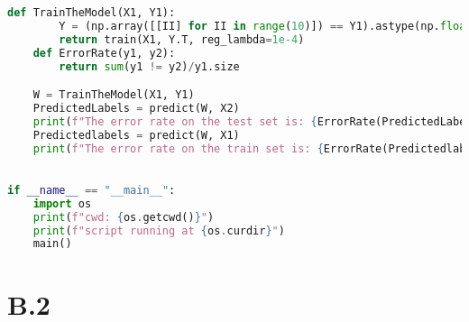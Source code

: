 \documentclass[]{article}
\begin{document}
\begin{lstlisting}[language=python]
    def TrainTheModel(X1, Y1):
        Y = (np.array([[II] for II in range(10)]) == Y1).astype(np.float)
        return train(X1, Y.T, reg_lambda=1e-4)
    def ErrorRate(y1, y2):
        return sum(y1 != y2)/y1.size

    W = TrainTheModel(X1, Y1)
    PredictedLabels = predict(W, X2)
    print(f"The error rate on the test set is: {ErrorRate(PredictedLabels, Y2)}")
    Predictedlabels = predict(W, X1)
    print(f"The error rate on the train set is: {ErrorRate(Predictedlabels, Y1)}")
 

if __name__ == "__main__":
    import os
    print(f"cwd: {os.getcwd()}")
    print(f"script running at {os.curdir}")
    main()
        \end{lstlisting}

    \section*{B.2}
        
        
\end{document}
